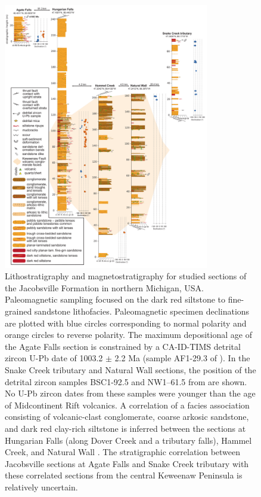 \documentclass[draft]{agujournal2019}
\begin{document}
\begin{figure}[h!]
\centering
\includegraphics[width=0.8\textwidth]{Jacobsville_Sections_v6.pdf}
\caption{Lithostratigraphy and magnetostratigraphy for studied sections of the Jacobsville Formation in northern Michigan, USA. Paleomagnetic sampling focused on the dark red siltstone to fine-grained sandstone lithofacies. Paleomagnetic specimen declinations are plotted with blue circles corresponding to normal polarity and orange circles to reverse polarity. The maximum depositional age of the Agate Falls section is constrained by a CA-ID-TIMS detrital zircon U-Pb date of 1003.2 $\pm$ 2.2 Ma (sample AF1-29.3 of ). In the Snake Creek tributary and Natural Wall sections, the position of the detrital zircon samples BSC1-92.5 and NW1–61.5 from  are shown. No U-Pb zircon dates from these samples were younger than the age of Midcontinent Rift volcanics. A correlation of a facies association consisting of volcanic-clast conglomerate, coarse arkosic sandstone, and dark red clay-rich siltstone is inferred between the sections at Hungarian Falls (along Dover Creek and a tributary falls), Hammel Creek, and Natural Wall \cite{Brojanigo1984a}. The stratigraphic correlation between Jacobsville sections at Agate Falls and Snake Creek tributary with these correlated sections from the central Keweenaw Peninsula is relatively uncertain.}
\label{fig:strat_column}
\end{figure}
\end{document}
